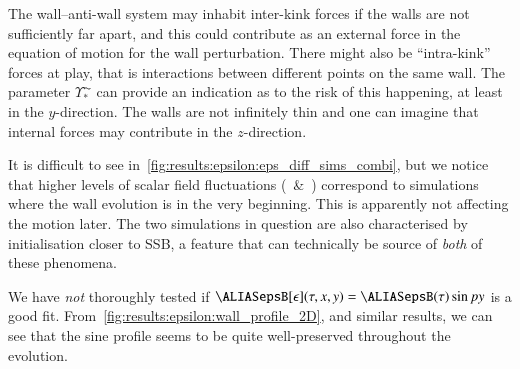         The wall--anti-wall system may inhabit inter-kink forces if the walls are not sufficiently far apart, and this could contribute as an external force in the equation of motion for the wall perturbation. There might also be ``intra-kink'' forces at play, that is interactions between different points on the same wall. The parameter $\Upsilon^{\AC}_\ast$ can provide an indication as to the risk of this happening, at least in the $y$-direction. The walls are not infinitely thin and one can imagine that internal forces may contribute in the $z$-direction.


        It is difficult to see in~\cref{fig:results:epsilon:eps_diff_sims_combi}, but we notice that higher levels of scalar field fluctuations (~\&~) correspond to simulations where the wall evolution is  in the very beginning. This is apparently not affecting the motion later. The two simulations in question are also characterised by initialisation closer to SSB, a feature that can technically be source of \emph{both} of these phenomena.

        We have \emph{not} thoroughly tested if $\epsB[\epsilon](\tau, x,y)=\epsB(\tau) \sin{py}$ is a good fit. From~\cref{fig:results:epsilon:wall_profile_2D}, and similar results, we can see that the sine profile seems to be quite well-preserved throughout the evolution. 







